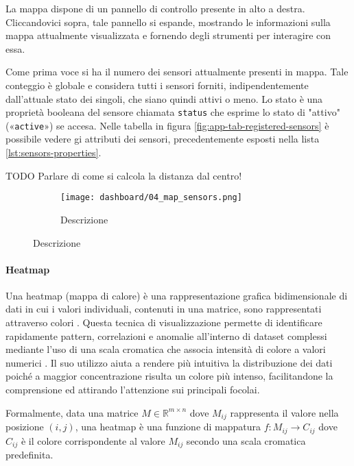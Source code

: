 La mappa dispone di un pannello di controllo presente in alto a destra.
Cliccandovici sopra, tale pannello si espande, mostrando le informazioni sulla mappa attualmente
visualizzata e fornendo degli strumenti per interagire con essa.

Come prima voce si ha il numero dei sensori attualmente presenti in mappa.
Tale conteggio è globale e considera tutti i sensori forniti, indipendentemente dall'attuale stato dei singoli,
che siano quindi attivi o meno. Lo stato è una proprietà booleana del sensore chiamata \texttt{status}
che esprime lo stato di "attivo" («\texttt{active}») se accesa.  Nelle tabella in figura
\ref{fig:app-tab-registered-sensors} è possibile vedere gi attributi dei sensori, precedentemente esposti nella lista
\ref{lst:sensors-properties}.

TODO Parlare di come si calcola la distanza dal centro!

\begin{figure}[H]
  \centering

  \begin{subfigure}{\textwidth}
    \centering
    \texttt{[image: dashboard/04\_map\_sensors.png]}
    \caption{Descrizione}
  \end{subfigure}

\end{figure}

\paragraph{Heatmap}

Una heatmap (mappa di calore) è una rappresentazione grafica bidimensionale di dati in cui i valori individuali,
contenuti in una matrice, sono rappresentati attraverso colori \citep{wilkinson2009grammar}.
Questa tecnica di visualizzazione permette di identificare rapidamente pattern, correlazioni e anomalie
all'interno di dataset complessi mediante l'uso di una scala cromatica che associa intensità di colore
a valori numerici \citep{cleveland1993visualizing}. Il suo utilizzo aiuta a rendere più intuitiva la distribuzione
dei dati poiché a maggior concentrazione risulta un colore più intenso, facilitandone la comprensione ed attirando
l'attenzione sui principali focolai.

Formalmente, data una matrice $M \in \mathbb{R}^{m \times n}$ dove $M_{ij}$ rappresenta il valore
nella posizione $(i,j)$, una heatmap è una funzione di mappatura $ f: M_{ij} \rightarrow C_{ij} $
dove $C_{ij}$ è il colore corrispondente al valore $M_{ij}$ secondo una scala cromatica predefinita.


